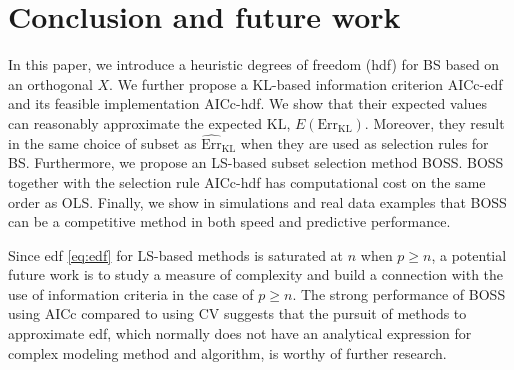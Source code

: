 \section{Conclusion and future work}
\label{sec:conclusion}
In this paper, we introduce a heuristic degrees of freedom (hdf) for BS based on an orthogonal $X$. We further propose a KL-based information criterion AICc-edf and its feasible implementation AICc-hdf. We show that their expected values can reasonably approximate the expected KL, $E(\text{Err}_\text{KL})$. Moreover, they result in the same choice of subset as $\widehat{\text{Err}}_{\text{KL}}$  when they are used as selection rules for BS. Furthermore, we propose an LS-based subset selection method BOSS. BOSS together with the selection rule AICc-hdf has computational cost on the same order as OLS. Finally, we show in simulations and real data examples that BOSS can be a competitive method in both speed and predictive performance. 

Since edf \eqref{eq:edf} for LS-based methods is saturated at $n$ when $p\ge n$, a potential future work is to study a measure of complexity and build a connection with the use of information criteria in the case of $p \ge n$. The strong performance of BOSS using AICc compared to using CV suggests that the pursuit of methods to approximate edf, which normally does not have an analytical expression for complex modeling method and algorithm, is worthy of further research.